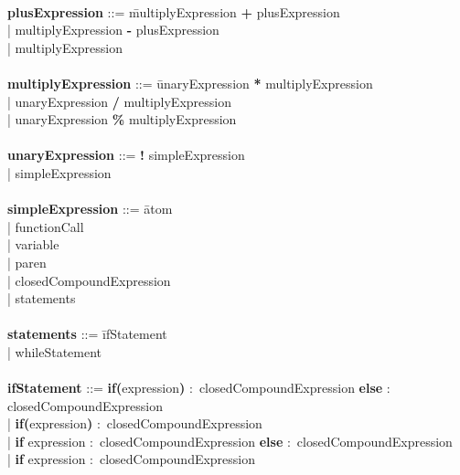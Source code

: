 \begin{tabbing}
\\ 
{\bf plusExpression}              ::= \=multiplyExpression \textbf{+} plusExpression\\
                                      \>| multiplyExpression \textbf{-} plusExpression\\
                                      \>| multiplyExpression\\
\\
{\bf multiplyExpression}          ::= \=unaryExpression \textbf{*} multiplyExpression\\
                                      \>| unaryExpression \textbf{/} multiplyExpression\\
                                      \>| unaryExpression \textbf{\%} multiplyExpression\\
\\
{\bf unaryExpression}             ::= \=\textbf{!} simpleExpression\\
                                      \>| simpleExpression\\ 
\\   
{\bf simpleExpression}            ::= \=atom\\
                                      \>| functionCall\\
                                      \>| variable\\
                                      \>| paren\\
                                      \>| closedCompoundExpression\\
                                      \>| statements\\
\\
{\bf statements}                  ::= \=ifStatement\\
                                      \>| whileStatement\\
\\
{\bf ifStatement}                 ::= \=\textbf{if}\=\textbf{(}expression\textbf{)} $\colon$ closedCompoundExpression \textbf{else} $\colon$ closedCompoundExpression\\
                                      \>| \textbf{if}\textbf{(}expression\textbf{)} $\colon$ closedCompoundExpression\\
                                      \>| \textbf{if} expression $\colon$ closedCompoundExpression \textbf{else} $\colon$ closedCompoundExpression\\
                                      \>| \textbf{if} expression $\colon$ closedCompoundExpression\\

\end{tabbing}
